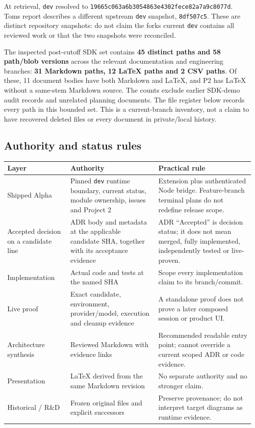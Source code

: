 \documentclass[
  10pt,
]{article}
\begin{document}
At retrieval, \nolinkurl{dev} resolved to
\nolinkurl{19665c063a6b3054863e4302fece82a7a9c8077d}. Tom\textquotesingle s
report describes a different upstream \nolinkurl{dev} snapshot,
\nolinkurl{8df507c5}. These are distinct repository snapshots: do not claim
the fork\textquotesingle s current \nolinkurl{dev} contains all reviewed
work or that the two snapshots were reconciled.

The inspected post-cutoff SDK set contains \textbf{45 distinct paths and
58 path/blob versions} across the relevant documentation and engineering
branches: \textbf{31 Markdown paths, 12 LaTeX paths and 2 CSV paths}. Of
these, 11 document bodies have both Markdown and LaTeX, and P2 has LaTeX
without a same-stem Markdown source. The counts exclude earlier SDK-demo
audit records and unrelated planning documents. The file register below
records every path in this bounded set. This is a current-branch
inventory, not a claim to have recovered deleted files or every document
in private/local history.

\hypertarget{authority-and-status-rules}{%
\subsection{Authority and status
rules}\label{authority-and-status-rules}}

\begin{longtable}[]{@{}>{\raggedright\arraybackslash}p{}>{\raggedright\arraybackslash}p{}>{\raggedright\arraybackslash}p{}@{}}
\toprule\noalign{}
Layer & Authority & Practical rule \\
\midrule\noalign{}
\endhead
\bottomrule\noalign{}
\endlastfoot
Shipped Alpha & Pinned \nolinkurl{dev} runtime boundary, current status,
module ownership, issues and Project 2 & Extension plus authenticated
Node bridge. Feature-branch terminal plans do not redefine release
scope. \\
Accepted decision on a candidate line & ADR body and metadata at the
applicable candidate SHA, together with its acceptance evidence & ADR
``Accepted'' is decision status; it does not mean merged, fully
implemented, independently tested or live-proven. \\
Implementation & Actual code and tests at the named SHA & Scope every
implementation claim to its branch/commit. \\
Live proof & Exact candidate, environment, provider/model, execution and
cleanup evidence & A standalone proof does not prove a later composed
session or product UI. \\
Architecture synthesis & Reviewed Markdown with evidence links &
Recommended readable entry point; cannot override a current scoped ADR
or code evidence. \\
Presentation & LaTeX derived from the same Markdown revision & No
separate authority and no stronger claim. \\
Historical / R\&D & Frozen original files and explicit successors &
Preserve provenance; do not interpret target diagrams as runtime
evidence. \\
\end{longtable}
\end{document}
